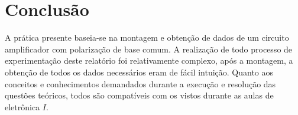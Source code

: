 \chapter{Conclus\~{a}o}
A prática presente baseia-se na montagem e obtenção de dados de um circuito amplificador com polarização de base comum.
A realização de todo processo de experimentação deste relatório foi relativamente complexo, após a montagem, a obtenção de todos os dados necessários eram de fácil intuição. Quanto aos conceitos e conhecimentos demandados durante a execução e resolução das questões teóricos, todos são compatíveis com os vistos durante as aulas de eletrônica $ I $. 